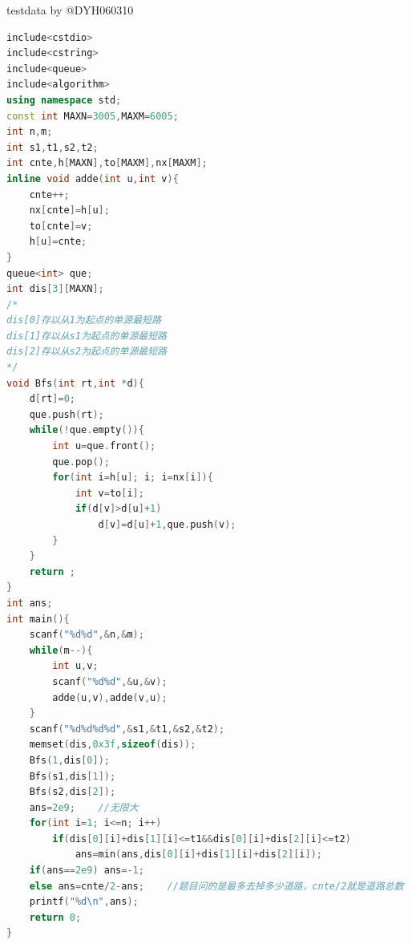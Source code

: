 \documentclass[12pt,twiside,a4paper]{ctexbook}
\numberwithin{chapter}{part}
\begin{document}
testdata by @DYH060310
\begin{lstlisting}[language=c++,breaklines=true]
include<cstdio>
include<cstring>
include<queue>
include<algorithm>
using namespace std;
const int MAXN=3005,MAXM=6005;
int n,m;
int s1,t1,s2,t2;
int cnte,h[MAXN],to[MAXM],nx[MAXM];
inline void adde(int u,int v){
	cnte++;
	nx[cnte]=h[u];
	to[cnte]=v;
	h[u]=cnte;
}
queue<int> que;
int dis[3][MAXN];
/*
dis[0]存以从1为起点的单源最短路
dis[1]存以从s1为起点的单源最短路
dis[2]存以从s2为起点的单源最短路
*/
void Bfs(int rt,int *d){
	d[rt]=0;
	que.push(rt);
	while(!que.empty()){
		int u=que.front();
		que.pop();
		for(int i=h[u]; i; i=nx[i]){
			int v=to[i];
			if(d[v]>d[u]+1)
				d[v]=d[u]+1,que.push(v);
		}
	}
	return ;
}
int ans;
int main(){
	scanf("%d%d",&n,&m);
	while(m--){
		int u,v;
		scanf("%d%d",&u,&v);
		adde(u,v),adde(v,u);
	}
	scanf("%d%d%d%d",&s1,&t1,&s2,&t2);
	memset(dis,0x3f,sizeof(dis));
	Bfs(1,dis[0]);
	Bfs(s1,dis[1]);
	Bfs(s2,dis[2]);
	ans=2e9;	//无限大
	for(int i=1; i<=n; i++)
		if(dis[0][i]+dis[1][i]<=t1&&dis[0][i]+dis[2][i]<=t2)
			ans=min(ans,dis[0][i]+dis[1][i]+dis[2][i]);
	if(ans==2e9) ans=-1;
	else ans=cnte/2-ans;	//题目问的是最多去掉多少道路，cnte/2就是道路总数（码风啊）
	printf("%d\n",ans);
	return 0;
}
\end{lstlisting}
\end{document}
